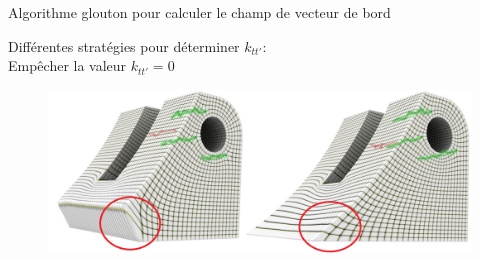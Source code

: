 \begin{frame}{Algorithme glouton pour calculer le champ de vecteur de bord}

    \begin{center}
        \begin{minipage}{0.4\linewidth}
        \end{minipage}
        \begin{minipage}{0.59\linewidth}
            \begin{algorithm}[H]
                \small
                \SetAlgoLined
                \label{algo:iterative_constraints}

            \end{algorithm}
        \end{minipage}
    \end{center}
\end{frame}        




\begin{frame}{Différentes stratégies pour déterminer $k_{tt'}$:\\ Empêcher la valeur $k_{tt'} = 0$}
    \begin{figure}
        \centering
        \includegraphics[width=\textwidth]{img/hexmeshing_ff/comparison_low_angle_edge_2.PNG}
    \end{figure}
\end{frame}

